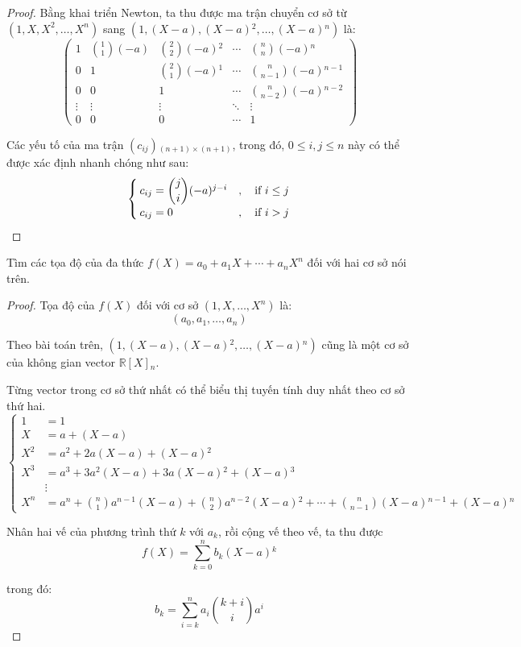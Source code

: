 \documentclass[class=linearalgebra,crop=false]{standalone}
\begin{document}
\begin{proof}
    \bigskip
    \par Bằng khai triển Newton, ta thu được ma trận chuyển cơ sở từ $(1, X, X^{2}, \ldots, X^{n})$ sang $(1, (X-a), (X-a){}^{2}, \ldots, (X-a){}^{n})$ là:
    \[
        \begin{pmatrix}
            1 & \binom{1}{1}(-a) & \binom{2}{2}(-a){}^{2} & \cdots & \binom{n}{n}(-a){}^{n} \\
            0 & 1 & \binom{2}{1}(-a){}^{1} & \cdots & \binom{n}{n-1}(-a){}^{n-1} \\
            0 & 0 & 1 & \cdots & \binom{n}{n-2}(-a){}^{n-2} \\
            \vdots & \vdots & \vdots & \ddots & \vdots \\
            0 & 0 & 0 & \cdots & 1
        \end{pmatrix}
    \]
    \par Các yếu tố của ma trận $(c_{ij}){}_{(n+1)\times(n+1)}$, trong đó, $0\le i, j \le n$ này có thể được xác định nhanh chóng như sau:
    \[
        \begin{cases}
            c_{ij} = \dbinom{j}{i}(-a){}^{j - i}&,\quad\text{if $i\le j$}\\
            c_{ij} = 0&,\quad\text{if $i > j$}
        \end{cases}
    \]
\end{proof}

\begin{exercise}Tìm các tọa độ của đa thức $f(X) = a_{0} + a_{1}X + \cdots + a_{n}X^{n}$ đối với hai cơ sở nói trên.
\end{exercise}

\begin{proof}Tọa độ của $f(X)$ đối với cơ sở $(1, X, \ldots, X^{n})$ là:
    \[ (a_{0}, a_{1}, \ldots, a_{n}) \]
    \par Theo bài toán trên, $(1, (X - a), (X - a){}^{2}, \ldots, (X - a){}^{n})$ cũng là một cơ sở của không gian vector $\mathbb{R}[X]{}_{n}$.
    \par Từng vector trong cơ sở thứ nhất có thể biểu thị tuyến tính duy nhất theo cơ sở thứ hai.
    \[
        \begin{cases}
            1 &= 1 \\
            X &= a + (X-a) \\
            X^{2} &= a^{2} + 2a(X-a) + (X-a){}^{2} \\
            X^{3} &= a^{3} + 3a^{2}(X-a) + 3a(X-a){}^{2} + (X-a){}^{3} \\
            &\vdots \\
            X^{n} &= a^{n} + \binom{n}{1}a^{n-1}(X-a) + \binom{n}{2}a^{n-2}(X-a){}^{2} + \cdots + \binom{n}{n-1}(X-a){}^{n-1} + (X-a){}^{n}
        \end{cases}
    \]
    \par Nhân hai vế của phương trình thứ $k$ với $a_{k}$, rồi cộng vế theo vế, ta thu được
    \[
        f(X) = \sum^{n}_{k=0}b_{k}(X-a){}^{k}
    \]
    \par trong đó:
    \[
        b_{k} = \sum^{n}_{i=k}a_{i}\binom{k+i}{i}a^{i}
    \]
\end{proof}
\end{document}
